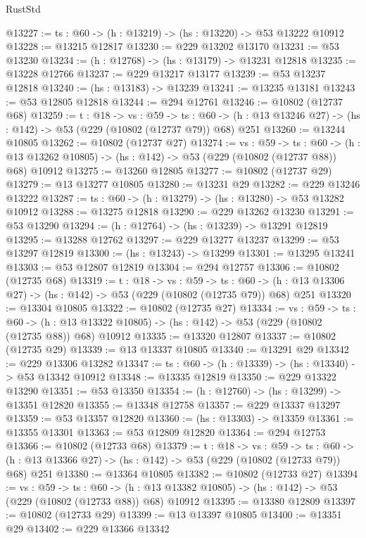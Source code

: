 \begin{lexlean}{RustStd}
\begin{coremodule}
@13227 := {ts : @60} -> (h : @13219) -> (hs : @13220) -> @53 @13222 @10912
@13228 := @13215 @12817
@13230 := @229 @13202 @13170
@13231 := @53 @13230
@13234 := (h : @12768) -> (hs : @13179) -> @13231 @12818
@13235 := @13228 @12766
@13237 := @229 @13217 @13177
@13239 := @53 @13237 @12818
@13240 := (hs : @13183) -> @13239
@13241 := @13235 @13181
@13243 := @53 @12805 @12818
@13244 := @294 @12761
@13246 := @10802 (@12737 @68)
@13259 := {t : @18} ->
  {vs : @59} ->
  {ts : @60} -> (h : @13 @13246 @27) -> (hs : @142) -> @53 (@229 (@10802 (@12737 @79)) @68) @251
@13260 := @13244 @10805
@13262 := @10802 (@12737 @27)
@13274 := {vs : @59} ->
  {ts : @60} ->
  (h : @13 @13262 @10805) -> (hs : @142) -> @53 (@229 (@10802 (@12737 @88)) @68) @10912
@13275 := @13260 @12805
@13277 := @10802 (@12737 @29)
@13279 := @13 @13277 @10805
@13280 := @13231 @29
@13282 := @229 @13246 @13222
@13287 := {ts : @60} -> (h : @13279) -> (hs : @13280) -> @53 @13282 @10912
@13288 := @13275 @12818
@13290 := @229 @13262 @13230
@13291 := @53 @13290
@13294 := (h : @12764) -> (hs : @13239) -> @13291 @12819
@13295 := @13288 @12762
@13297 := @229 @13277 @13237
@13299 := @53 @13297 @12819
@13300 := (hs : @13243) -> @13299
@13301 := @13295 @13241
@13303 := @53 @12807 @12819
@13304 := @294 @12757
@13306 := @10802 (@12735 @68)
@13319 := {t : @18} ->
  {vs : @59} ->
  {ts : @60} -> (h : @13 @13306 @27) -> (hs : @142) -> @53 (@229 (@10802 (@12735 @79)) @68) @251
@13320 := @13304 @10805
@13322 := @10802 (@12735 @27)
@13334 := {vs : @59} ->
  {ts : @60} ->
  (h : @13 @13322 @10805) -> (hs : @142) -> @53 (@229 (@10802 (@12735 @88)) @68) @10912
@13335 := @13320 @12807
@13337 := @10802 (@12735 @29)
@13339 := @13 @13337 @10805
@13340 := @13291 @29
@13342 := @229 @13306 @13282
@13347 := {ts : @60} -> (h : @13339) -> (hs : @13340) -> @53 @13342 @10912
@13348 := @13335 @12819
@13350 := @229 @13322 @13290
@13351 := @53 @13350
@13354 := (h : @12760) -> (hs : @13299) -> @13351 @12820
@13355 := @13348 @12758
@13357 := @229 @13337 @13297
@13359 := @53 @13357 @12820
@13360 := (hs : @13303) -> @13359
@13361 := @13355 @13301
@13363 := @53 @12809 @12820
@13364 := @294 @12753
@13366 := @10802 (@12733 @68)
@13379 := {t : @18} ->
  {vs : @59} ->
  {ts : @60} -> (h : @13 @13366 @27) -> (hs : @142) -> @53 (@229 (@10802 (@12733 @79)) @68) @251
@13380 := @13364 @10805
@13382 := @10802 (@12733 @27)
@13394 := {vs : @59} ->
  {ts : @60} ->
  (h : @13 @13382 @10805) -> (hs : @142) -> @53 (@229 (@10802 (@12733 @88)) @68) @10912
@13395 := @13380 @12809
@13397 := @10802 (@12733 @29)
@13399 := @13 @13397 @10805
@13400 := @13351 @29
@13402 := @229 @13366 @13342

\end{coremodule}
\end{lexlean}
